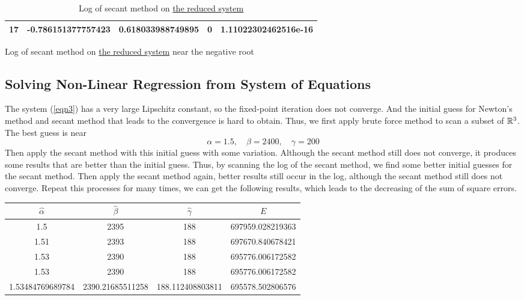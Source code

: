 \begin{table}[H]
\begin{table}[H]
\begin{table}[H]
\begin{table}[H]
\begin{table}[htbp]
\begin{subtable}[t]{\textwidth}
\begin{tabular}{|c|c|c|c|c|}
		17	&	\footnotesize	-0.786151377757423		&	\footnotesize	0.618033988749895	&	\footnotesize	0						&	\footnotesize	1.11022302462516e-16	\\	\hline
		\end{tabular}
		\caption{Log of secant method on \hyperref[eqn1reduce]{the reduced system} near the negative root}
		\label{logeqn1se-}
	\end{subtable}
	\caption{Log of secant method on \hyperref[eqn1reduce]{the reduced system}}
	\label{logeqn1se}
	\end{table}



\subsection{Solving Non-Linear Regression from System of Equations}
The system (\ref{eqn3}) has a very large Lipschitz constant, so the fixed-point iteration does not converge.
And the initial guess for Newton's method and secant method that leads to the convergence is hard to obtain.
Thus, we first apply brute force method to scan a subset of \(\mathbb{R}^3\).
The best guess is near
\[ \alpha=1.5,\quad \beta=2400, \quad \gamma=200 \]
Then apply the secant method with this initial guess with some variation.
Although the secant method still does not converge, it produces some results that are better than the initial guess.
Thus, by scanning the log of the secant method, we find some better initial guesses for the secant method.
Then apply the secant method again, better results still occur in the log, although the secant method still does not converge.
Repeat this processes for many times, we can get the following results, which leads to the decreasing of the sum of square errors.
\ifnum{}
	\begin{table}[H]
\else
	\begin{table}[htbp]
\fi
	\centering
	\begin{tabular}{|c|c|c|c|}
	\hline
	\(\hat\alpha\)	&	\(\hat\beta\)	&	\(\hat\gamma\)	&	\hyperref[sse]{\(E\)}	\\	\hline
	1.5					&	2395				&	188					&	697959.028219363	\\	\hline	
	1.51				&	2393				&	188					&	697670.840678421	\\	\hline	
	1.53				&	2390				&	188					&	695776.006172582	\\	\hline	
	1.53				&	2390				&	188					&	695776.006172582	\\	\hline	
	1.53484769689784	&	2390.21685511258	&	188.112408803811	&	695578.502806576	\\	\hline	

\end{tabular}
\end{table}
\end{table}
\end{table}
\end{table}
\end{table}
\end{table}
